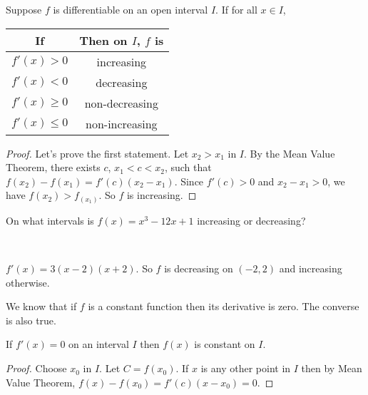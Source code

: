 \documentclass[calc1-main.tex]{subfiles}
\begin{document}
  \begin{theorem}
    Suppose $f$ is differentiable on an open interval $I$. If for all $x \in I$,
    \begin{table}[H]
      \centering
      \begin{tabular}{|c|c|}
        \hline
        If & Then on $I$, $f$ is \\
        \hline
        $f'(x) > 0$ & increasing \\
        $f'(x) < 0$ & decreasing \\
        $f'(x) \ge 0$ & non-decreasing \\
        $f'(x) \le 0$ & non-increasing \\
        \hline
      \end{tabular}
    \end{table}

  \end{theorem}
  \begin{proof}
    Let's prove the first statement. Let $x_2 > x_1$ in $I$. By the Mean Value Theorem, there exists $c$, $x_1< c < x_2$, such that $f(x_2) - f(x_1) = f'(c) (x_2 - x_1)$. Since $f'(c)>0$  and $x_2-x_1>0$, we have $f(x_2) > f_(x_1)$. So $f$ is increasing.
  \end{proof}

  \begin{example}
    On what intervals is $f(x) = x^3 - 12 x + 1$ increasing or decreasing?
  \end{example}
  \begin{solution}
    ~\\
    \begin{minipage}{0.5\textwidth}
      $f'(x) = 3(x-2)(x+2)$. So $f$ is decreasing on $(-2, 2)$ and increasing otherwise.
    \end{minipage}%
    \begin{minipage}{0.5\textwidth}
      \begin{figure}[H]
        \centering
        
      \end{figure}
    \end{minipage}

  \end{solution}

  We know that if $f$ is a constant function then its derivative is zero. The converse is also true.
  \begin{theorem} \label{THM: functions with zero derivative are constant}
    If $f'(x) = 0$ on an interval $I$ then $f(x)$ is constant on $I$.
  \end{theorem}
  \begin{proof}
    Choose $x_0$ in $I$. Let $C = f(x_0)$. If $x$ is any other point in $I$ then by Mean Value Theorem, $f(x) - f(x_0) = f'(c) (x-x_0) = 0$.
  \end{proof}
\end{document}
